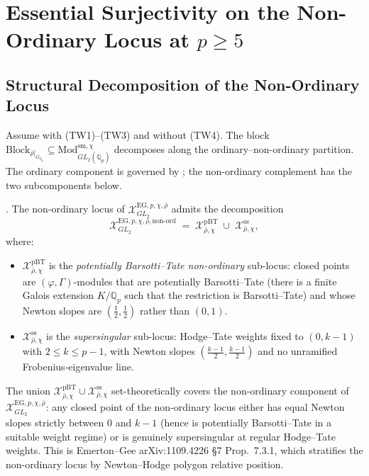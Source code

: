\section{Essential Surjectivity on the Non-Ordinary Locus at \(p\geq 5\)}
\label{v4-arith:w6-e:non-ord}

\subsection{Structural Decomposition of the Non-Ordinary Locus}

Assume  with (TW1)--(TW3) and without
(TW4). The
block
\(\mathrm{Block}_{\bar\rho|_{G_{\mathbb{Q}_{p}}}}\subseteq
\mathrm{Mod}_{GL_{2}(\mathbb{Q}_{p})}^{\mathrm{sm},\chi}\)
decomposes along the ordinary--non-ordinary partition. The ordinary
component is governed by ; the
non-ordinary complement has the two subcomponents below.

\begin{definition}
\label{v4-arith:w6-e:def:non-ord-sub-loci}
\ClaimStatusDefinitional. The non-ordinary locus of
\(\mathcal{X}^{\mathrm{EG},p,\chi,\bar\rho}_{GL_{2}}\) admits the
decomposition
\[
\mathcal{X}^{\mathrm{EG},p,\chi,\bar\rho,\mathrm{non\text{-}ord}}_{GL_{2}}
\;=\;\mathcal{X}^{\mathrm{pBT}}_{\bar\rho,\chi}\;\cup\;
\mathcal{X}^{\mathrm{ss}}_{\bar\rho,\chi},
\]
where:
\begin{itemize}
\item \(\mathcal{X}^{\mathrm{pBT}}_{\bar\rho,\chi}\) is the
\emph{potentially Barsotti--Tate non-ordinary} sub-locus: closed
points are \((\varphi,\Gamma)\)-modules that are potentially
Barsotti--Tate (there is a finite Galois extension
\(K/\mathbb{Q}_{p}\) such that the restriction is Barsotti--Tate) and
whose Newton slopes are \((\tfrac{1}{2},\tfrac{1}{2})\) rather than
\((0,1)\).
\item \(\mathcal{X}^{\mathrm{ss}}_{\bar\rho,\chi}\) is the
\emph{supersingular} sub-locus: Hodge--Tate weights fixed to
\((0,k-1)\) with \(2\leq k\leq p-1\), with Newton slopes
\((\tfrac{k-1}{2},\tfrac{k-1}{2})\) and no unramified Frobenius-eigenvalue
line.
\end{itemize}
\end{definition}

\begin{remark}
\label{v4-arith:w6-e:rem:non-ord-extent}
The union \(\mathcal{X}^{\mathrm{pBT}}_{\bar\rho,\chi}\cup
\mathcal{X}^{\mathrm{ss}}_{\bar\rho,\chi}\) set-theoretically covers
the non-ordinary component of
\(\mathcal{X}^{\mathrm{EG},p,\chi,\bar\rho}_{GL_{2}}\): any closed
point of the non-ordinary locus either has equal Newton slopes
strictly between \(0\) and \(k-1\) (hence is potentially Barsotti--Tate
in a suitable weight regime) or is genuinely supersingular at
regular Hodge--Tate weights. This is Emerton--Gee
arXiv:1109.4226 \S 7 Prop.~7.3.1, which stratifies the non-ordinary
locus by Newton--Hodge polygon relative position.
\end{remark}

